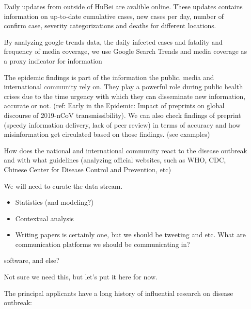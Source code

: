 Daily updates from outside of HuBei are avalible online.
These updates contains information on up-to-date cumulative cases, new cases per day, number of confirm case, severity categorizations and deaths for different locations.

By analyzing google trends data, the daily infected cases and fatality and frequency of media coverage, we use Google Search Trends and media coverage as a proxy indicator for information

The epidemic findings is part of the information the public, media and international community rely on. They play a powerful role during public health crises due to the time urgency with which they can disseminate new information, accurate or not. (ref: Early in the Epidemic: Impact of preprints on global discourse of 2019-nCoV transmissibility). We can also check findings of preprint (speedy information delivery, lack of peer review) in terms of accuracy and how misinformation get circulated based on those findings. (see examples)

How does the national and international community react to the disease outbreak and with what guidelines (analyzing official websites, such as WHO, CDC, Chinese Center for Disease Control and Prevention, etc)

We will need to curate the data-stream.

\begin{itemize}
\item{Statistics (and modeling?)}
\item{Contextual analysis}
\end{itemize}

\begin{itemize}
\item{Writing papers is certainly one, but we should be tweeting and etc. What are communication platforms we should be communicating in?}
\end{itemize}


software, and else?

Not sure we need this, but let's put it here for now. 


The principal applicants have a long history of influential research on disease outbreak: 

